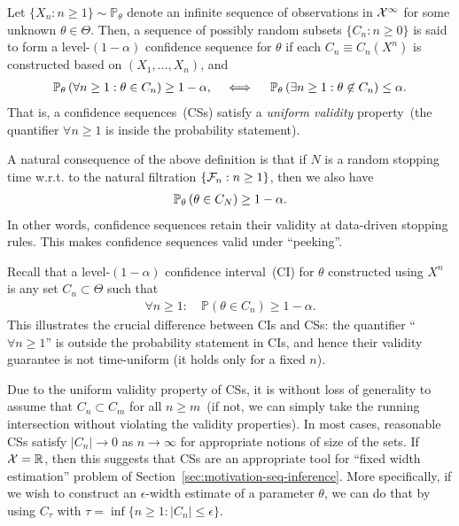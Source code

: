 \documentclass[12pt]{article}
\begin{document}
\begin{definition}
    \label{def:conf-seqs}  Let $\{X_n: n \geq 1\} \sim \mathbb{P}_\theta$ denote an infinite sequence of observations in $ {\cal X}^\infty$ for some unknown $\theta \in \Theta$. Then, a sequence of possibly random subsets $\{C_n: n \geq 0\}$ is said to form a level-$(1-\alpha)$ confidence sequence for $\theta$ if each $C_n \equiv C_n(X^n)$ is constructed based on $(X_1, \ldots, X_n)$, and 
    \begin{align}
        \mathbb{P}_{\theta}\left(  \forall n \geq 1: \theta \in C_n \right) \geq 1- \alpha, \quad \iff \quad \mathbb{P}_{\theta}\left(  \exists n \geq 1: \theta \not \in C_n \right) \leq \alpha.
    \end{align}
    That is, a confidence sequences~(CSs) satisfy a \emph{uniform validity} property~(the quantifier $\forall n \geq 1$ is inside the probability statement). 
\end{definition}

\begin{remark}
    A natural consequence of the above definition is that if $N$ is a random stopping time w.r.t. to the natural filtration $\{{\cal F}_n: n \geq 1\}$, then we also have 
    \begin{align}
        \mathbb{P}_{\theta}\left( \theta \in C_N \right) \geq 1-\alpha. 
    \end{align}
    In other words, confidence sequences retain their validity at data-driven stopping rules. This makes confidence sequences valid under ``peeking''. 
\end{remark}

\begin{remark}
    Recall that a level-$(1-\alpha)$ confidence interval~(CI) for $\theta$ constructed using $X^n$ is any set $C_n \subset \Theta$ such that 
    \begin{align}
        \forall n\geq 1: \quad \mathbb{P}(\theta \in C_n) \geq 1-\alpha. 
    \end{align}
    This illustrates the crucial difference between CIs and CSs: the quantifier ``$\forall n \geq 1$'' is outside the probability statement in CIs, and hence their validity guarantee is not time-uniform (it holds only for a fixed $n$). 
\end{remark}

\begin{remark}
    \label{remark:fixed-width-estimation-CSs} Due to the uniform validity property of CSs, it is without loss of generality to assume that $C_n \subset C_m$ for all $n \geq m$~(if not, we can simply take the running intersection without violating the validity properties). In most cases, reasonable CSs satisfy $|C_n| \to 0$ as $n\to \infty$ for appropriate notions of size of the sets. If ${\cal X}=\mathbb{R}$, then this suggests that CSs are an appropriate tool for ``fixed width estimation'' problem of Section~\ref{sec:motivation-seq-inference}. More specifically, if we wish to construct an $\epsilon$-width estimate  of a parameter $\theta$, we can do that by using $C_\tau$ with $\tau = \inf \{n \geq 1: |C_n| \leq \epsilon\}$.  
\end{remark}
\end{document}
